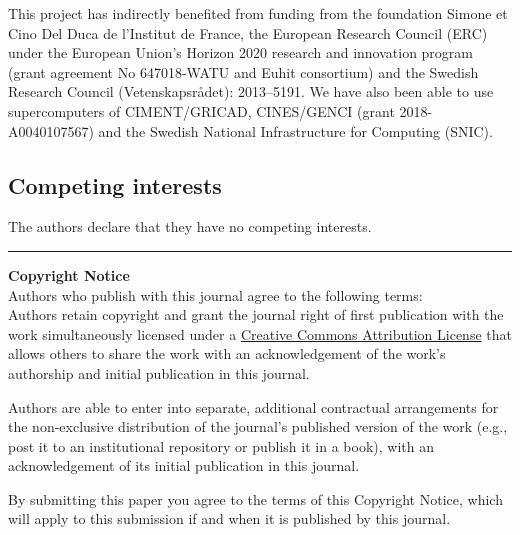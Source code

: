 
This project has indirectly benefited from funding from the foundation Simone et
Cino Del Duca de l'Institut de France, the European Research Council (ERC)
under the European Union's Horizon 2020 research and innovation program (grant
agreement No 647018-WATU and Euhit consortium) and the Swedish Research Council
(Vetenskapsr{\aa}det): 2013--5191.
%
We have also been able to use supercomputers of CIMENT/GRICAD, CINES/GENCI
(grant 2018-A0040107567) and the Swedish National Infrastructure for Computing
(SNIC).

\subsection{Competing interests}


The authors declare that they have no competing interests.



\rule{\textwidth}{1pt}

{\bf Copyright Notice} \\
Authors who publish with this journal agree to the following terms: \\

Authors retain copyright and grant the journal right of first publication with
the work simultaneously licensed under a
\href{http://creativecommons.org/licenses/by/3.0/}{Creative Commons Attribution
License} that allows others to share the work with an acknowledgement of the
work's authorship and initial publication in this journal.

Authors are able to enter into separate, additional contractual arrangements
for the non-exclusive distribution of the journal's published version of the
work (e.g., post it to an institutional repository or publish it in a book),
with an acknowledgement of its initial publication in this journal.

By submitting this paper you agree to the terms of this Copyright Notice, which
will apply to this submission if and when it is published by this journal.

